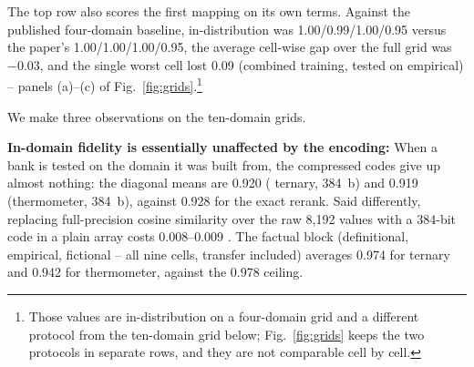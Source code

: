 The top row also scores the first mapping on its own terms. Against
the published four-domain baseline, in-distribution \auroc was
1.00/0.99/1.00/0.95 versus the paper's 1.00/1.00/1.00/0.95, the
average cell-wise gap over the full grid was $-0.03$, and the single
worst cell lost 0.09 (combined training, tested on empirical) --
panels (a)--(c) of Fig.~\ref{fig:grids}.\footnote{Those values are
in-distribution \auroc on a four-domain grid and a different protocol
from the ten-domain grid below; Fig.~\ref{fig:grids} keeps the two
protocols in separate rows, and they are not comparable cell by
cell.}

We make three observations on the ten-domain grids.

\textbf{In-domain fidelity is essentially unaffected by the encoding:}
When a bank is tested on the domain it was built from, the compressed
codes give up almost nothing: the diagonal means are 0.920 (\signrp
ternary, 384~b) and 0.919 (thermometer, 384~b), against 0.928 for the
exact rerank. Said differently, replacing full-precision cosine
similarity over the raw 8{,}192 values with a 384-bit code in a plain
array costs 0.008--0.009 \auroc. The factual block (definitional,
empirical, fictional -- all nine cells, transfer included) averages
0.974 for ternary and 0.942 for thermometer, against the 0.978
ceiling.

